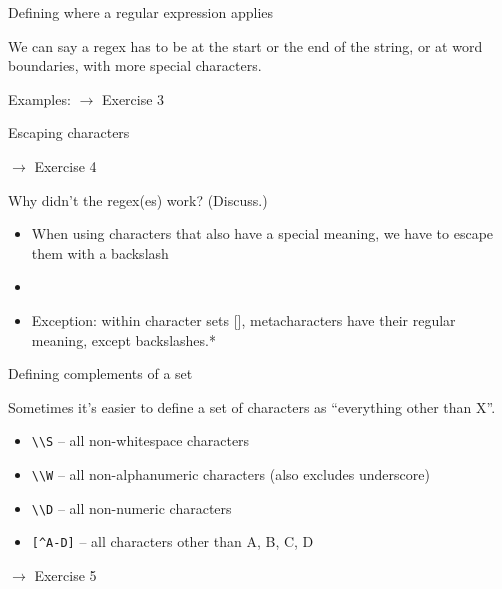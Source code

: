 \documentclass{beamer}
\begin{document}
\begin{frame}{Defining where a regular expression applies}

We can say a regex has to be at the start or the end of the string, or at word boundaries,
with more special characters.


Examples: $\rightarrow$ Exercise 3

\end{frame}

\verbdef{\specialchartext}{\^ \$ \. \\}

\begin{frame}{Escaping characters}

$\rightarrow$ Exercise 4

\bigskip

Why didn't the regex(es) work? (Discuss.)

\begin{itemize}
 \item When using characters that also have a special meaning, we have to escape them with a backslash
 \item \specialchartext
 \item Exception: within character sets [], metacharacters have their regular meaning, except backslashes.*
\end{itemize}

\end{frame}

\begin{frame}{Defining complements of a set}

Sometimes it's easier to define a set of characters as ``everything other than X''.

\begin{itemize}
  \item \lstinline$\\S$ -- all non-whitespace characters
  \item \lstinline$\\W$ -- all non-alphanumeric characters (also excludes underscore)
  \item \lstinline$\\D$ -- all non-numeric characters
  \item \lstinline$[^A-D]$ -- all characters other than A, B, C, D
\end{itemize}

\bigskip
$\rightarrow$ Exercise 5

\end{frame}
\end{document}
